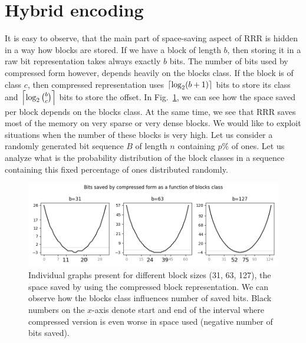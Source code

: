 \section{Hybrid encoding}


It is easy to observe, that the main part of space-saving aspect of RRR is hidden in
a way how blocks are stored. If we have a block of length $b$, then storing it in
a raw bit representation takes always exactly $b$ bits. The number of bits used by
compressed form however, depends heavily on the blocks class. If the block is of class
$c$, then compressed representation uses $\left\lceil \log_2 (b+1) \right\rceil$ bits to store its
class and $\left\lceil \log_2{b\choose c} \right\rceil$ bits to store the offset. In Fig.~\ref{obr:rrrSpaceSavings},
we can see how the space saved per block depends on the blocks class. At the same
time, we see that RRR saves most of the memory on very sparse or very dense blocks.
We would like to exploit situations when the number of these blocks is very high.
Let us consider a randomly generated bit sequence $B$ of length $n$ containing
$p\%$ of ones. Let us analyze what is the probability distribution of the block
classes in a sequence containing this fixed percentage of ones distributed randomly. 

\begin{figure}
	\centerline{
		\includegraphics[width=\textwidth]{images/rrr_space_savings}
	}
	\caption[TODO]{Individual graphs present for different block sizes (31, 63, 127), 
    the space saved by using the compressed block representation. We can observe how
    the blocks class influences number of saved bits. Black numbers on the $x$-axis
    denote start and end of the interval where compressed version is even worse
    in space used (negative number of bits saved).
	}
	\label{obr:rrrSpaceSavings}
\end{figure}

